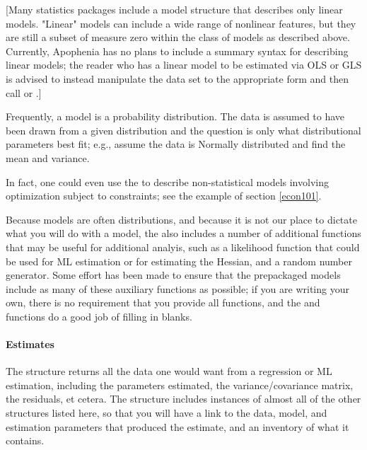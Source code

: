 [Many statistics packages include a model structure that describes only
linear models.  "Linear" models can include a wide range of nonlinear
features, but they are still a subset of measure zero within the class of
models as described above. Currently, Apophenia has no plans to include
a summary syntax for describing linear models; the reader who has a linear
model to be estimated via OLS or GLS is advised to instead manipulate
the data set to the appropriate form and then call  or
.]

Frequently, a model is a probability distribution. The data is assumed
to have been drawn from a given distribution and the question is
only what distributional parameters best fit; e.g., assume the data
is Normally distributed and find the mean and variance.

In fact, one could even use the  to describe 
non-statistical models involving optimization subject to constraints;
see the example of section \ref{econ101}.

Because models are often distributions, and because it is not our place
to dictate what you will do with a model, the  also includes a
number of additional functions that may be useful for additional analyis,
such as a likelihood function that could be used for ML estimation or
for estimating the Hessian, and a random number generator. Some effort
has been made to ensure that the prepackaged models include as many of
these auxiliary functions as possible; if you are writing your own,
there is no requirement that you provide all functions, and the  and 
functions do a good job of filling in blanks.

\paragraph{Estimates}
The  structure returns all the data one would want
from a regression or ML estimation, including the parameters estimated,
the variance/covariance matrix, the residuals, et cetera. The structure
includes instances of almost all of the other structures listed here, so
that you will have a link to the data, model, and estimation parameters
that produced the estimate, and an inventory of what it contains.


